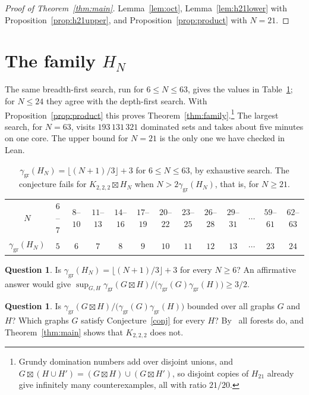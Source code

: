 \documentclass[11pt]{amsart}
\theoremstyle{definition}
\newtheorem{question}[theorem]{Question}
\theoremstyle{remark}
\numberwithin{equation}{section}
\newcommand{\ggr}{\gamma_{\mathrm{gr}}}
\newcommand{\sprod}{\boxtimes}
\newcommand{\oct}{K_{2,2,2}}
\begin{document}
\begin{proof}[Proof of Theorem~\ref{thm:main}]
Lemma~\ref{lem:oct}, Lemma~\ref{lem:h21lower} with Proposition~\ref{prop:h21upper}, and Proposition~\ref{prop:product} with $N=21$.
\end{proof}

\section{The family \texorpdfstring{$H_N$}{HN}}\label{sec:family}

The same breadth-first search, run for $6\le N\le 63$, gives the values in Table~\ref{tab:values}; for $N\le24$ they agree with the depth-first search. With Proposition~\ref{prop:product} this proves Theorem~\ref{thm:family}.\footnote{Grundy domination numbers add over disjoint unions, and $G\sprod(H\cup H')=(G\sprod H)\cup(G\sprod H')$, so disjoint copies of $H_{21}$ already give infinitely many counterexamples, all with ratio $21/20$.} The largest search, for $N=63$, visits $193\,131\,321$ dominated sets and takes about five minutes on one core. The upper bound for $N=21$ is the only one we have checked in Lean.

\begin{table}[ht]
\centering
\caption{$\ggr(H_N)=\lfloor (N+1)/3\rfloor+3$ for $6\le N\le63$, by exhaustive search. The conjecture fails for $\oct\sprod H_N$ when $N>2\ggr(H_N)$, that is, for $N\ge21$.}\label{tab:values}
\small
\begin{tabular}{@{}c*{12}{c}@{}}
\toprule
$N$ & $6$--$7$ & $8$--$10$ & $11$--$13$ & $14$--$16$ & $17$--$19$ & $20$--$22$ & $23$--$25$ & $26$--$28$ & $29$--$31$ & $\cdots$ & $59$--$61$ & $62$--$63$\\
$\ggr(H_N)$ & $5$ & $6$ & $7$ & $8$ & $9$ & $10$ & $11$ & $12$ & $13$ & $\cdots$ & $23$ & $24$\\
\bottomrule
\end{tabular}
\end{table}

\begin{question}\label{q:formula}
Is $\ggr(H_N)=\lfloor (N+1)/3\rfloor+3$ for every $N\ge6$? An affirmative answer would give $\sup_{G,H}\ggr(G\sprod H)/\big(\ggr(G)\ggr(H)\big)\ge3/2$.
\end{question}

\begin{question}\label{q:sup}
Is $\ggr(G\sprod H)/\big(\ggr(G)\ggr(H)\big)$ bounded over all graphs $G$ and $H$? Which graphs $G$ satisfy Conjecture~\ref{conj} for every $H$? By~\cite{BDKW} all forests do, and Theorem~\ref{thm:main} shows that $\oct$ does not.
\end{question}
\end{document}
